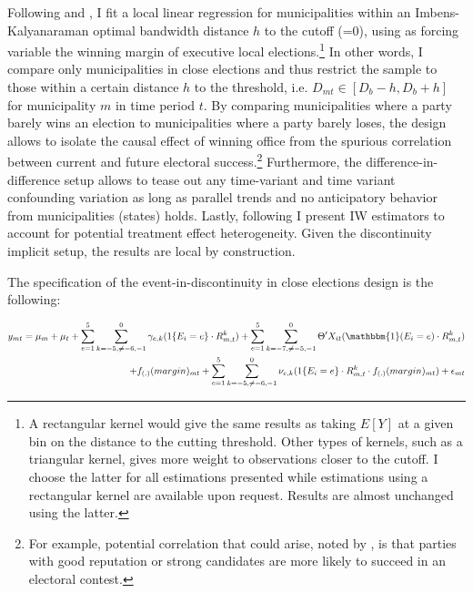 \documentclass[12pt]{amsart}
\numberwithin{equation}{section}
\theoremstyle{definition}
\theoremstyle{definition}
\theoremstyle{definition}
\begin{document}
Following \citet{grembi_2016} and \citet{gelman_imbens2014}, I fit a local linear regression for municipalities within an Imbens-Kalyanaraman optimal bandwidth distance $h$ to the cutoff (=0), using as forcing variable the winning margin of executive local elections.\footnote{A rectangular kernel would give the same results as taking $E[Y]$ at a given bin on the distance to the cutting threshold. Other types of kernels, such as a triangular kernel, gives more weight to observations closer to the cutoff. I choose the latter for all estimations presented while estimations using a rectangular kernel are available upon request. Results are almost unchanged using the latter.} In other words, I compare only municipalities in close elections and thus restrict the sample to those within a certain distance $h$ to the threshold, i.e. $D_{mt} \in [D_b-h, D_b+h]$ for municipality $m$ in time period $t$. By comparing municipalities where a party barely wins an election to municipalities where a party barely loses, the design allows to isolate the causal effect of winning office from the spurious correlation between current and future electoral success.\footnote{For example, potential correlation that could arise, noted by \citet{klasnja_titiunik_2017}, is that parties with good reputation or strong candidates are more likely to succeed in an electoral contest.} Furthermore, the difference-in-difference setup allows to tease out any time-variant and time variant confounding variation as long as parallel trends and no anticipatory behavior from municipalities (states) holds. Lastly, following \citet{abraham_sun_2020} I present IW estimators to account for potential treatment effect heterogeneity. Given the discontinuity implicit setup, the results are local by construction. 

The specification of the event-in-discontinuity in close elections design is the following:

\begin{equation}
\begin{split}
y_{mt}=\mu_m + \mu_t + \sum^5_{e=1} \sum^0_{k=-5, \neq {-6,-1}} \gamma_{e,k}(1\{E_i=e\} \cdot R^k_{m,t}) + \sum^5_{e=1} \sum^0_{k=-7, \neq {-5,-1}}  \Theta'X_{it} (\mathbbm{1}(E_i=e)\cdot R^k_{m,t})  \\
+ f_{(.)}(margin)_{mt} + \sum^5_{e=1} \sum^0_{k=-5, \neq {-6,-1}} \nu_{e,k}(1\{E_i=e\} \cdot R^k_{m,t} \cdot  f_{(.)}(margin)_{mt} )+ \epsilon_{mt}
\end{split}
\end{equation}     
\end{document}
